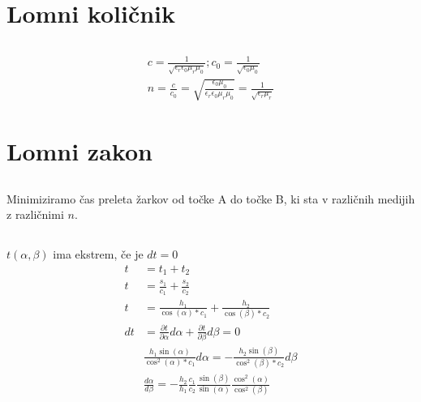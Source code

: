 \documentclass[a4paper,12pt]{article}
\begin{document}
\newpage
\section{Lomni količnik}
\subsection{}
\begin{align}
    c = \frac{1}{\sqrt{\epsilon_r \epsilon_0 \mu_r \mu_0}}; c_0 = \frac{1}{\sqrt{\epsilon_0\mu_0}} \\
    n = \frac{c}{c_0} = \sqrt{\frac{\epsilon_0\mu_0}{\epsilon_r \epsilon_0 \mu_r \mu_0}} = \frac{1}{\sqrt{\epsilon_r \mu_r}}
\end{align}

\newpage
\section{Lomni zakon} \label{sec:lomni_zakon}
\subsection{}
Minimiziramo čas preleta žarkov od točke A do točke B, ki sta v različnih medijih z različnimi $n$.

\subsection{}
$t(\alpha, \beta)$ ima ekstrem, če je $dt = 0$
\begin{align}
    t  & = t_1 + t_2                                                                                                                        \\
    t  & = \frac{s_1}{c_1} + \frac{s_2}{c_2}                                                                                                \\
    t  & = \frac{h_1}{\cos(\alpha) * c_1} + \frac{h_2}{\cos(\beta) * c_2}                                                                   \\
    dt & = \frac{\partial t}{\partial \alpha} d\alpha + \frac{\partial t}{\partial \beta} d\beta = 0                                        \\
       & \frac{h_1 \sin(\alpha)}{\cos^2(\alpha) * c_1} d\alpha = -\frac{h_2 \sin(\beta)}{\cos^2(\beta) * c_2} d\beta                        \\
       & \frac{d \alpha}{d \beta} = - \frac{h_2}{h_1} \frac{c_1}{c_2} \frac{\sin(\beta)}{\sin(\alpha)} \frac{\cos^2(\alpha)}{\cos^2(\beta)}
\end{align}
\end{document}
